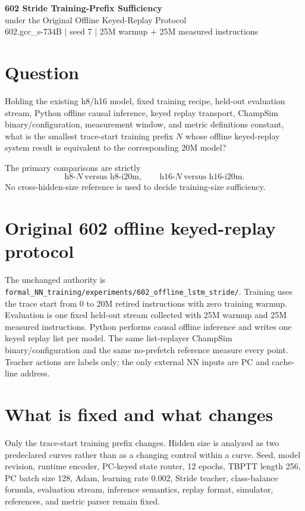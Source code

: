 \documentclass[10pt]{article}
\begin{document}
\begin{center}
{\LARGE\bfseries\color{navy} 602 Stride Training-Prefix Sufficiency}\\[2pt]
{\large under the Original Offline Keyed-Replay Protocol}\\[5pt]
{\small 602.gcc\_s-734B \quad $\vert$ \quad seed 7 \quad $\vert$ \quad
25M warmup + 25M measured instructions}
\end{center}

\section{Question}
Holding the existing h8/h16 model, fixed training recipe, held-out evaluation
stream, Python offline causal inference, keyed replay transport, ChampSim
binary/configuration, measurement window, and metric definitions constant,
what is the smallest trace-start training prefix $N$ whose offline keyed-replay
system result is equivalent to the corresponding 20M model?

The primary comparisons are strictly
\[
\text{h8-}N\ \text{versus h8-i20m},\qquad
\text{h16-}N\ \text{versus h16-i20m}.
\]
No cross-hidden-size reference is used to decide training-size sufficiency.

\section{Original 602 offline keyed-replay protocol}
The unchanged authority is
\texttt{formal\_NN\_training/experiments/602\_offline\_lstm\_stride/}.
Training uses the trace start from 0 to 20M retired instructions with zero
training warmup. Evaluation is one fixed held-out stream collected with 25M
warmup and 25M measured instructions. Python performs causal offline inference
and writes one keyed replay list per model. The same list-replayer ChampSim
binary/configuration and the same no-prefetch reference measure every point.
Teacher actions are labels only; the only external NN inputs are PC and
cache-line address.

\section{What is fixed and what changes}
Only the trace-start training prefix changes. Hidden size is analyzed as two
predeclared curves rather than as a changing control within a curve. Seed,
model revision, runtime encoder, PC-keyed state router, 12 epochs, TBPTT length
256, PC batch size 128, Adam, learning rate 0.002, Stride teacher, class-balance
formula, evaluation stream, inference semantics, replay format, simulator,
references, and metric parser remain fixed.
\end{document}
